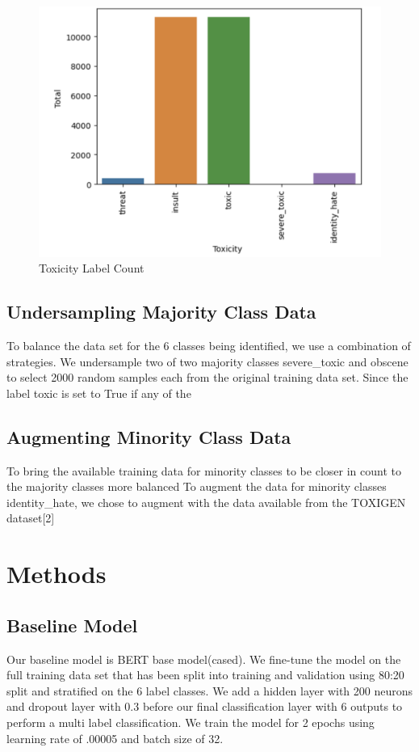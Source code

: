 \documentclass[11pt,a4paper]{article}
\begin{document}
\begin{figure}[h]
\centering
\includegraphics[scale=0.4]{label_counts.png}
\caption{Toxicity Label Count}
\end{figure}

\subsection{Undersampling Majority Class Data}
To balance the data set for the 6 classes being identified, we use a combination of strategies. We undersample two of two majority classes severe\_toxic and obscene to select 2000 random samples each from the original training data set. Since the label toxic is set to True if any of the 

\subsection{Augmenting Minority Class Data}
To bring the available training data for minority classes to be closer in count to the majority classes more balanced To augment the data for minority classes identity\_hate, we chose to augment with the data available from the TOXIGEN dataset[2]


\section{Methods}

\subsection{Baseline Model}
Our baseline model is BERT base model(cased). We fine-tune the model on the full training data set that has been split into training and validation using 80:20 split and stratified on the 6 label classes. We add a hidden layer with 200 neurons and dropout layer with 0.3 before our final classification layer with 6 outputs to perform a multi label classification. We train the model for 2 epochs using learning rate of .00005 and batch size of 32.
\end{document}
